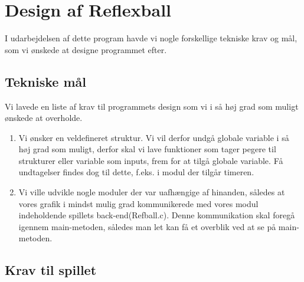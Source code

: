 \section{Design af Reflexball}
I udarbejdelsen af dette program havde vi nogle forskellige tekniske krav og mål, som vi ønskede at designe programmet efter.
\subsection{Tekniske mål}
Vi lavede en liste af krav til programmets design som vi i så høj grad som muligt ønskede at overholde. 
\begin{enumerate}
\item Vi ønsker en veldefineret struktur. Vi vil derfor undgå globale variable i så høj grad som muligt, derfor skal vi lave funktioner som tager pegere til strukturer eller variable som inputs, frem for at tilgå globale variable. Få undtagelser findes dog til dette, f.eks. i modul der tilgår timeren.
\item Vi ville udvikle nogle moduler  der var uafhængige af hinanden, således at vores grafik i mindst mulig grad kommunikerede med vores modul indeholdende spillets back-end(Refball.c). Denne kommunikation skal foregå igennem main-metoden, således man let kan få et overblik ved at se på main-metoden.
	
\end{enumerate}


\subsection{Krav til spillet}

